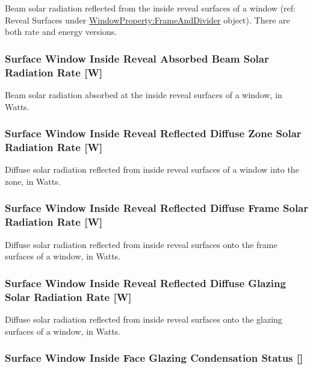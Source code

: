Beam solar radiation reflected from the inside reveal surfaces of a window (ref: Reveal Surfaces under \hyperref[windowpropertyframeanddivider]{WindowProperty:FrameAndDivider} object). There are both rate and energy versions.

\subsubsection{Surface Window Inside Reveal Absorbed Beam Solar Radiation Rate {[}W{]}}\label{surface-window-inside-reveal-absorbed-beam-solar-radiation-rate-w}

Beam solar radiation absorbed at the inside reveal surfaces of a window, in Watts.

\subsubsection{Surface Window Inside Reveal Reflected Diffuse Zone Solar Radiation Rate {[}W{]}}\label{surface-window-inside-reveal-reflected-diffuse-zone-solar-radiation-rate-w}

Diffuse solar radiation reflected from inside reveal surfaces of a window into the zone, in Watts.

\subsubsection{Surface Window Inside Reveal Reflected Diffuse Frame Solar Radiation Rate {[}W{]}}\label{surface-window-inside-reveal-reflected-diffuse-frame-solar-radiation-rate-w}

Diffuse solar radiation reflected from inside reveal surfaces onto the frame surfaces of a window, in Watts.

\subsubsection{Surface Window Inside Reveal Reflected Diffuse Glazing Solar Radiation Rate {[}W{]}}\label{surface-window-inside-reveal-reflected-diffuse-glazing-solar-radiation-rate-w}

Diffuse solar radiation reflected from inside reveal surfaces onto the glazing surfaces of a window, in Watts.

\subsubsection{Surface Window Inside Face Glazing Condensation Status {[]}}\label{surface-window-inside-face-glazing-condensation-status}

